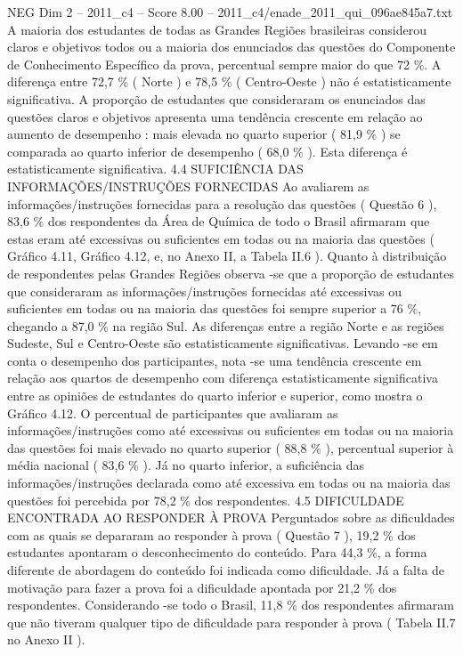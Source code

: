 \begin{textsample}{NEG Dim 2 – 2011\_c4 – Score 8.00 – 2011\_c4/enade\_2011\_qui\_096ae845a7.txt}
A maioria dos estudantes de todas as Grandes Regiões brasileiras considerou claros e objetivos todos ou a maioria dos enunciados das questões do Componente de Conhecimento Específico da prova, percentual sempre maior do que 72 \%.
A diferença entre 72,7 \% ( Norte ) e 78,5 \% ( Centro-Oeste ) não é estatisticamente significativa.
A proporção de estudantes que consideraram os enunciados das questões claros e objetivos apresenta uma tendência crescente em relação ao aumento de desempenho : mais elevada no quarto superior ( 81,9 \% ) se comparada ao quarto inferior de desempenho ( 68,0 \% ).
Esta diferença é estatisticamente significativa. 4.4 SUFICIÊNCIA DAS INFORMAÇÕES/INSTRUÇÕES FORNECIDAS Ao avaliarem as informações/instruções fornecidas para a resolução das questões ( Questão 6 ), 83,6 \% dos respondentes da Área de Química de todo o Brasil afirmaram que estas eram até excessivas ou suficientes em todas ou na maioria das questões ( Gráfico 4.11, Gráfico 4.12, e, no Anexo II, a Tabela II.6 ).
Quanto à distribuição de respondentes pelas Grandes Regiões observa -se que a proporção de estudantes que consideraram as informações/instruções fornecidas até excessivas ou suficientes em todas ou na maioria das questões foi sempre superior a 76 \%, chegando a 87,0 \% na região Sul.
As diferenças entre a região Norte e as regiões Sudeste, Sul e Centro-Oeste são estatisticamente significativas.
Levando -se em conta o desempenho dos participantes, nota -se uma tendência crescente em relação aos quartos de desempenho com diferença estatisticamente significativa entre as opiniões de estudantes do quarto inferior e superior, como mostra o Gráfico 4.12.
O percentual de participantes que avaliaram as informações/instruções como até excessivas ou suficientes em todas ou na maioria das questões foi mais elevado no quarto superior ( 88,8 \% ), percentual superior à média nacional ( 83,6 \% ).
Já no quarto inferior, a suficiência das informações/instruções declarada como até excessiva em todas ou na maioria das questões foi percebida por 78,2 \% dos respondentes. 4.5 DIFICULDADE ENCONTRADA AO RESPONDER À PROVA Perguntados sobre as dificuldades com as quais se depararam ao responder à prova ( Questão 7 ), 19,2 \% dos estudantes apontaram o desconhecimento do conteúdo.
Para 44,3 \%, a forma diferente de abordagem do conteúdo foi indicada como dificuldade.
Já a falta de motivação para fazer a prova foi a dificuldade apontada por 21,2 \% dos respondentes.
Considerando -se todo o Brasil, 11,8 \% dos respondentes afirmaram que não tiveram qualquer tipo de dificuldade para responder à prova ( Tabela II.7 no Anexo II ).

\end{textsample}
